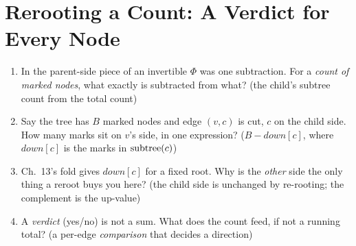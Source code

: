 \section{Rerooting a Count: A Verdict for Every Node}\label{sec:c20-counting}

\begin{previouslybox}
\begin{enumerate}[nosep, leftmargin=1.6em]
  \item In  the parent-side piece of an invertible $\Phi$ was
        one subtraction. For a \emph{count of marked nodes}, what exactly is
        subtracted from what? (the child's subtree count from the total count)
  \item Say the tree has $B$ marked nodes and edge $(v,c)$ is cut, $c$ on the
        child side. How many marks sit on $v$'s side, in one expression?
        ($B - \mathit{down}[c]$, where $\mathit{down}[c]$ is the marks in
        $\operatorname{subtree}(c)$)
  \item Ch.~13's fold gives $\mathit{down}[c]$ for a fixed root. Why is the
        \emph{other} side the only thing a reroot buys you here? (the child side
        is unchanged by re-rooting; the complement is the up-value)
  \item A \emph{verdict} (yes/no) is not a sum. What does the count feed, if not
        a running total? (a per-edge \emph{comparison} that decides a direction)
\end{enumerate}
\end{previouslybox}

